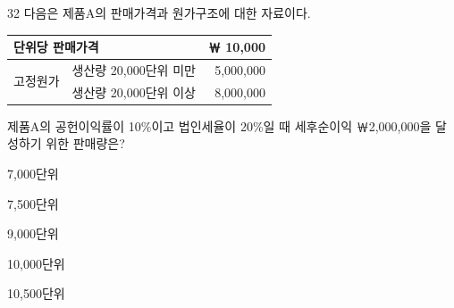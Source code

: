 \begin{question}{32}
다음은 제품A의 판매가격과 원가구조에 대한 자료이다.
\begin{center}
\small
\begin{tabular}{|l|l|r|}
\hline
\multicolumn{2}{|l|}{단위당 판매가격} & ￦ 10,000 \\
\hline
\multirow{2}{*}{고정원가} & 생산량 20,000단위 미만 & 5,000,000 \\
\cline{2-3}
 & 생산량 20,000단위 이상 & 8,000,000 \\
\hline
\end{tabular}
\end{center}
제품A의 공헌이익률이 10\%이고 법인세율이 20\%일 때 세후순이익 ￦2,000,000을 달성하기 위한 판매량은? \par
\begin{choices}
  \item 7,000단위
  \item 7,500단위
  \item 9,000단위
  \item 10,000단위
  \item 10,500단위
\end{choices}
\end{question}
